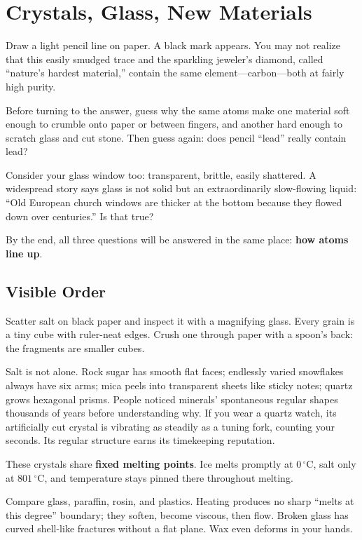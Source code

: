 \chapter{Crystals, Glass, New Materials}

\begin{kaichang}
Draw a light pencil line on paper. A black mark appears. You may not realize that this easily smudged trace and the sparkling jeweler's diamond, called ``nature's hardest material,'' contain the same element---carbon---both at fairly high purity.

Before turning to the answer, guess why the same atoms make one material soft enough to crumble onto paper or between fingers, and another hard enough to scratch glass and cut stone. Then guess again: does pencil ``lead'' really contain lead?

Consider your glass window too: transparent, brittle, easily shattered. A widespread story says glass is not solid but an extraordinarily slow-flowing liquid: ``Old European church windows are thicker at the bottom because they flowed down over centuries.'' Is that true?

By the end, all three questions will be answered in the same place: \textbf{how atoms line up}.
\end{kaichang}

\section{Visible Order}

Scatter salt on black paper and inspect it with a magnifying glass. Every grain is a tiny cube with ruler-neat edges. Crush one through paper with a spoon's back: the fragments are smaller cubes.

Salt is not alone. Rock sugar has smooth flat faces; endlessly varied snowflakes always have six arms; mica peels into transparent sheets like sticky notes; quartz grows hexagonal prisms. People noticed minerals' spontaneous regular shapes thousands of years before understanding why. If you wear a quartz watch, its artificially cut crystal is vibrating as steadily as a tuning fork, counting your seconds. Its regular structure earns its timekeeping reputation.

These crystals share \textbf{fixed melting points}. Ice melts promptly at $0\,^{\circ}\mathrm{C}$, salt only at $801\,^{\circ}\mathrm{C}$, and temperature stays pinned there throughout melting.

Compare glass, paraffin, rosin, and plastics. Heating produces no sharp ``melts at this degree'' boundary; they soften, become viscous, then flow. Broken glass has curved shell-like fractures without a flat plane. Wax even deforms in your hands.

